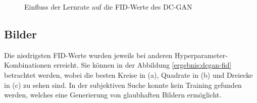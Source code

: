 \begin{figure}[H]
	\centering
	\qquad
	\caption{Einfluss der Lernrate auf die FID-Werte des DC-GAN}
	\label{ergebnis:dcgan-lr}
\end{figure}

\subsection{Bilder}
Die niedrigsten FID-Werte wurden jeweils bei anderen Hyperparameter-Kombinationen erreicht.
Sie können in der Abbildung \ref{ergebnis:dcgan-fid} betrachtet werden, wobei die besten Kreise in (a), Quadrate in (b) und Dreiecke in (c) zu sehen sind.
In der subjektiven Suche konnte kein Training gefunden werden, welches eine Generierung von glaubhaften Bildern ermöglicht.


